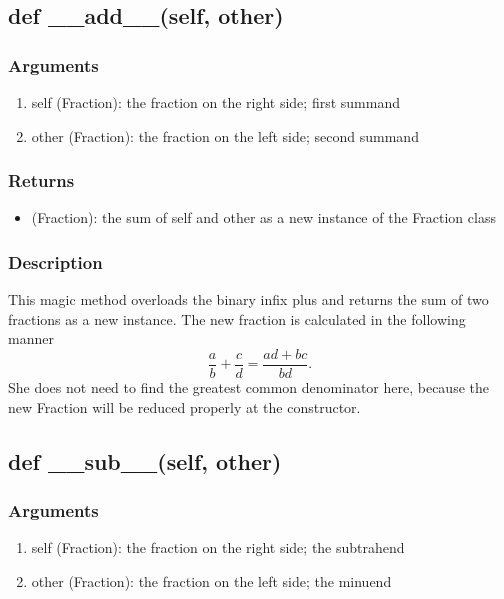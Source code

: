 \documentclass[refman]{scrartcl}
\begin{document}
\subsection{def \_\_add\_\_(self, other)}

\subsubsection*{Arguments}

\begin{enumerate}
	\item self (Fraction): the fraction on the right side; first summand
	\item other (Fraction): the fraction on the left side; second summand
\end{enumerate}

\subsubsection*{Returns}

\begin{itemize}
	\item (Fraction): the sum of self and other as a new instance of the Fraction class
\end{itemize}

\subsubsection*{Description}

This magic method overloads the binary infix plus and returns the sum of two fractions as a new instance. The new fraction is calculated in the following manner
%
\begin{equation}
	\frac{a}{b} + \frac{c}{d} = \frac{ad + bc}{bd} \text{.}
\end{equation}
%
She does not need to find the greatest common denominator here, because the new Fraction will be reduced properly at the constructor.

\subsection{def \_\_sub\_\_(self, other)}

\subsubsection*{Arguments}

\begin{enumerate}
	\item self (Fraction): the fraction on the right side; the subtrahend
	\item other (Fraction): the fraction on the left side; the minuend
\end{enumerate}
\end{document}
